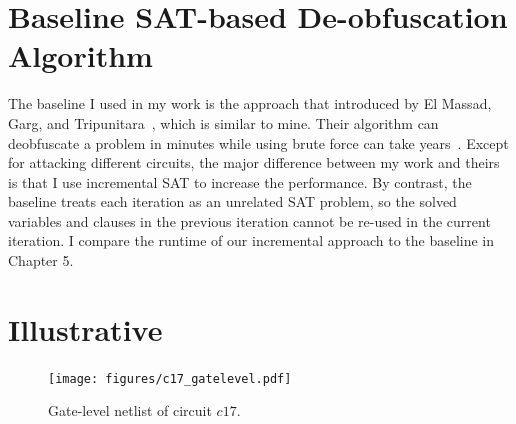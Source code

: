 \documentclass[thesis]{umassthesis}  %
\begin{document}

\section{Baseline SAT-based De-obfuscation Algorithm}

The baseline I used in my work is the approach that introduced by El Massad, Garg, and Tripunitara~\cite{elmassad-15}, which is similar to mine. Their algorithm can deobfuscate a problem in minutes while using brute force can take years~\cite{rajendran-13}. Except for attacking different circuits, the major difference between my work and theirs is that I use incremental SAT to increase the performance. By contrast, the baseline treats each iteration as an unrelated SAT problem, so the solved variables and clauses in the previous iteration cannot be re-used in the current iteration. I compare the runtime of our incremental approach to the baseline in Chapter 5.
















\section{Illustrative}
\begin{figure}[t] 
\begin{center}
\texttt{[image: figures/c17\_gatelevel.pdf]}
\caption{Gate-level netlist of circuit $c17$.}
\label{fig:c17_original}
\end{center}
\end{figure}
\end{document}
